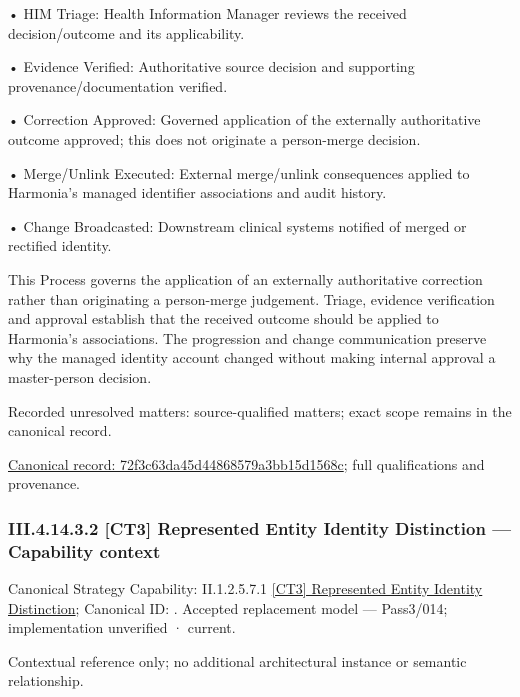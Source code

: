 •
HIM Triage: Health Information Manager reviews the received decision/outcome and its applicability.



•
Evidence Verified: Authoritative source decision and supporting provenance/documentation verified.



•
Correction Approved: Governed application of the externally authoritative outcome approved; this does not originate a person-merge decision.



•
Merge/Unlink Executed: External merge/unlink consequences applied to Harmonia's managed identifier associations and audit history.



•
Change Broadcasted: Downstream clinical systems notified of merged or rectified identity.



This Process governs the application of an externally authoritative correction rather than originating a person-merge judgement. Triage, evidence verification and approval establish that the received outcome should be applied to Harmonia's associations. The progression and change communication preserve why the managed identity account changed without making internal approval a master-person decision.


{\small Recorded unresolved matters: source-qualified matters; exact scope remains in the canonical record.}\par
{\footnotesize \href{../../../../continuum/business/business-process/72f3c63da45d44868579a3bb15d1568c.md}{Canonical record: 72f3c63da45d44868579a3bb15d1568c}; full qualifications and provenance.}\par
\subsubsection*{III.4.14.3.2 [CT3] Represented Entity Identity Distinction — Capability context}
\label{navigation:III.4.14.3.2}

{\small Canonical Strategy Capability: II.1.2.5.7.1 \hyperref[element:d403533b88f243d0aa555a3a7566b5d1]{[CT3] Represented Entity Identity Distinction}; Canonical ID: \texttt{}. Accepted replacement model — Pass3/014; implementation unverified · current.}\par
Contextual reference only; no additional architectural instance or semantic relationship.\par
